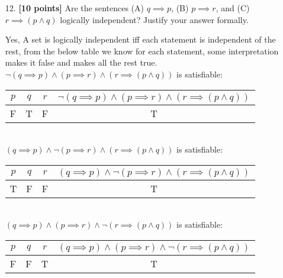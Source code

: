 \documentclass{article}
\begin{document}
\begin{enumerate}
\item[12.] \textbf{[10 points]} Are the sentences (A) $q \implies p$,
  (B) $p \implies r$, and (C) $r \implies (p \land q)$ logically
  independent?  Justify your answer formally.
    
   \begin{answer}
    Yes, A set is logically independent iff each statement is independent of the rest, from the below table we know for each statement, some interpretation makes it false and makes all the rest true.\\
    $\neg(q \implies p) \land (p \implies r) \land (r \implies (p \land q))$ is satisfiable:\\
        \begin{tabular}{|c|c|c|c|} \hline
        $p$ & $q$ & $r$ & $\neg(q \implies p) \land (p \implies r) \land (r \implies (p \land q))$\\ \hline
        F & T & F & T  \\ \hline
        \end{tabular}\\
    $(q \implies p) \land \neg(p \implies r) \land (r \implies (p \land q))$ is satisfiable:\\
        \begin{tabular}{|c|c|c|c|} \hline
        $p$ & $q$ & $r$ & $(q \implies p) \land \neg(p \implies r) \land (r \implies (p \land q))$\\ \hline
        T & F & F & T  \\ \hline
        \end{tabular}\\
    $(q \implies p) \land (p \implies r) \land \neg(r \implies (p \land q))$ is satisfiable:\\
        \begin{tabular}{|c|c|c|c|} \hline
        $p$ & $q$ & $r$ & $(q \implies p) \land (p \implies r) \land \neg(r \implies (p \land q))$\\ \hline
        F & F & T & T  \\ \hline
        \end{tabular}
    \end{answer}
\end{enumerate}
\end{document}
